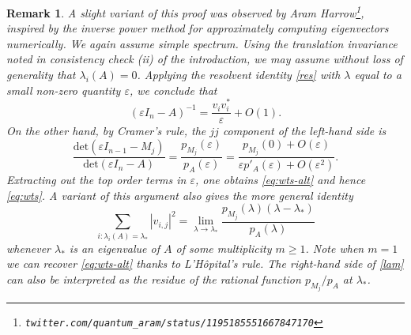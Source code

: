 \documentclass{amsart}
\newcommand\eps{\varepsilon}
\newtheorem{remark}[lemma]{Remark}
\begin{document}
\begin{remark} A slight variant of this proof was observed by Aram Harrow\footnote{{\tt twitter.com/quantum\_aram/status/1195185551667847170}}, inspired by the inverse power method for approximately computing eigenvectors numerically.  We again assume simple spectrum. Using the translation invariance noted in consistency check (ii) of the introduction, we may assume without loss of generality that $\lambda_i(A)=0$.  Applying the resolvent identity \eqref{res} with $\lambda$ equal to a small non-zero quantity $\eps$, we conclude that
\begin{equation}\label{epsin}
 (\eps I_n - A)^{-1} = \frac{v_i v_i^*}{\eps} + O(1).
\end{equation}
On the other hand, by Cramer's rule, the $jj$ component of the left-hand side is 
$$ \frac{\mathrm{det}(\eps I_{n-1} - M_j)}{\mathrm{det}(\eps I_n - A)} = \frac{p_{M_j}(\eps)}{p_A(\eps)} = \frac{p_{M_j}(0) + O(\eps)}{\eps p'_A(\eps) + O(\eps^2)}.$$
Extracting out the top order terms in $\eps$, one obtains \eqref{eq:wts-alt} and hence \eqref{eq:wts}.  A variant of this argument also gives the more general identity
\begin{equation}\label{lam}
 \sum_{i: \lambda_i(A) = \lambda_*} |v_{i,j}|^2 = \lim_{\lambda \to \lambda_*} \frac{p_{M_j}(\lambda) (\lambda - \lambda_*)}{p_A(\lambda)}
\end{equation}
whenever $\lambda_*$ is an eigenvalue of $A$ of some multiplicity $m \geq 1$.  Note when $m=1$ we can recover \eqref{eq:wts-alt} thanks to L'H\^{o}pital's rule.  The right-hand side of \eqref{lam} can also be interpreted as the residue of the rational function $p_{M_j}/p_A$ at $\lambda_*$.
\end{remark}
\end{document}
